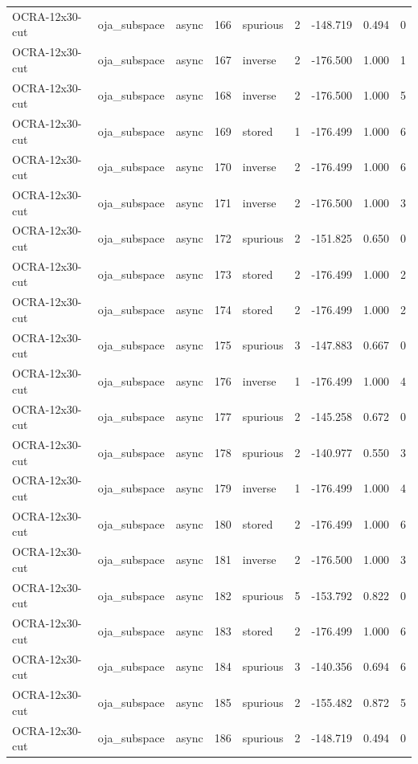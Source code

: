 \begin{tabular}{lllrlrrrr}
OCRA-12x30-cut & oja\_subspace & async & 166 & spurious & 2 & -148.719 & 0.494 & 0 \\
OCRA-12x30-cut & oja\_subspace & async & 167 & inverse & 2 & -176.500 & 1.000 & 1 \\
OCRA-12x30-cut & oja\_subspace & async & 168 & inverse & 2 & -176.500 & 1.000 & 5 \\
OCRA-12x30-cut & oja\_subspace & async & 169 & stored & 1 & -176.499 & 1.000 & 6 \\
OCRA-12x30-cut & oja\_subspace & async & 170 & inverse & 2 & -176.499 & 1.000 & 6 \\
OCRA-12x30-cut & oja\_subspace & async & 171 & inverse & 2 & -176.500 & 1.000 & 3 \\
OCRA-12x30-cut & oja\_subspace & async & 172 & spurious & 2 & -151.825 & 0.650 & 0 \\
OCRA-12x30-cut & oja\_subspace & async & 173 & stored & 2 & -176.499 & 1.000 & 2 \\
OCRA-12x30-cut & oja\_subspace & async & 174 & stored & 2 & -176.499 & 1.000 & 2 \\
OCRA-12x30-cut & oja\_subspace & async & 175 & spurious & 3 & -147.883 & 0.667 & 0 \\
OCRA-12x30-cut & oja\_subspace & async & 176 & inverse & 1 & -176.499 & 1.000 & 4 \\
OCRA-12x30-cut & oja\_subspace & async & 177 & spurious & 2 & -145.258 & 0.672 & 0 \\
OCRA-12x30-cut & oja\_subspace & async & 178 & spurious & 2 & -140.977 & 0.550 & 3 \\
OCRA-12x30-cut & oja\_subspace & async & 179 & inverse & 1 & -176.499 & 1.000 & 4 \\
OCRA-12x30-cut & oja\_subspace & async & 180 & stored & 2 & -176.499 & 1.000 & 6 \\
OCRA-12x30-cut & oja\_subspace & async & 181 & inverse & 2 & -176.500 & 1.000 & 3 \\
OCRA-12x30-cut & oja\_subspace & async & 182 & spurious & 5 & -153.792 & 0.822 & 0 \\
OCRA-12x30-cut & oja\_subspace & async & 183 & stored & 2 & -176.499 & 1.000 & 6 \\
OCRA-12x30-cut & oja\_subspace & async & 184 & spurious & 3 & -140.356 & 0.694 & 6 \\
OCRA-12x30-cut & oja\_subspace & async & 185 & spurious & 2 & -155.482 & 0.872 & 5 \\
OCRA-12x30-cut & oja\_subspace & async & 186 & spurious & 2 & -148.719 & 0.494 & 0 \\

\end{tabular}
